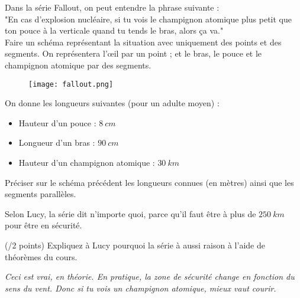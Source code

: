 
\begin{minipage}[t]{0.6\textwidth}
    Dans la série Fallout, on peut entendre la phrase suivante : 
    \\"En cas d'explosion nucléaire, si tu vois le champignon atomique plus petit que ton pouce à la verticale quand tu tends le bras, alors ça va."
    \vspace{1em}\\
    \cnt Faire un schéma représentant la situation avec uniquement des points et des segments. On représentera l'œil par un point ; et le bras, le pouce et le champignon atomique par des segments.

\end{minipage}
\hfill
\begin{minipage}[t]{0.35\textwidth}
    \begin{figure}[H]
        \centering
        \texttt{[image: fallout.png]}
    \end{figure}
\end{minipage}

\vspace{4em}
On donne les longueurs suivantes (pour un adulte moyen) :

\begin{itemize}
\item Hauteur d'un pouce : $8~cm$
\item Longueur d'un bras : $90~cm$
\item Hauteur d'un champignon atomique : $30~km$
\end{itemize}
\vspace{1em}
\cnt Préciser sur le schéma précédent les longueurs connues (en mètres) ainsi que les segments parallèles.

Selon Lucy, la série dit n'importe quoi, parce qu'il faut être à plus de $250~km$ pour être en sécurité. 

\cnt (/2 points) Expliquez à Lucy pourquoi la série à aussi raison à l'aide de théorèmes du cours.

\vspace*{\fill}
\textit{Ceci est vrai, en théorie. En pratique, la zone de sécurité change en fonction du sens du vent. Donc si tu vois un champignon atomique, mieux vaut courir.}